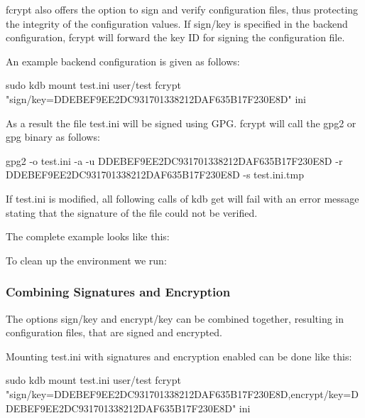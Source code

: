 {\ttfamily fcrypt} also offers the option to sign and verify configuration files, thus protecting the integrity of the configuration values. If {\ttfamily sign/key} is specified in the backend configuration, {\ttfamily fcrypt} will forward the key ID for signing the configuration file.

An example backend configuration is given as follows\+: \begin{DoxyVerb}sudo kdb mount test.ini user/test fcrypt "sign/key=DDEBEF9EE2DC931701338212DAF635B17F230E8D" ini
\end{DoxyVerb}


As a result the file {\ttfamily test.\+ini} will be signed using G\+PG. {\ttfamily fcrypt} will call the {\ttfamily gpg2} or {\ttfamily gpg} binary as follows\+: \begin{DoxyVerb}gpg2 -o test.ini -a -u DDEBEF9EE2DC931701338212DAF635B17F230E8D -r DDEBEF9EE2DC931701338212DAF635B17F230E8D -s test.ini.tmp
\end{DoxyVerb}


If {\ttfamily test.\+ini} is modified, all following calls of {\ttfamily kdb get} will fail with an error message stating that the signature of the file could not be verified.

The complete example looks like this\+:




To clean up the environment we run\+:




\subsubsection*{Combining Signatures and Encryption}

The options {\ttfamily sign/key} and {\ttfamily encrypt/key} can be combined together, resulting in configuration files, that are signed and encrypted.

Mounting {\ttfamily test.\+ini} with signatures and encryption enabled can be done like this\+: \begin{DoxyVerb}sudo kdb mount test.ini user/test fcrypt "sign/key=DDEBEF9EE2DC931701338212DAF635B17F230E8D,encrypt/key=DDEBEF9EE2DC931701338212DAF635B17F230E8D" ini
\end{DoxyVerb}


